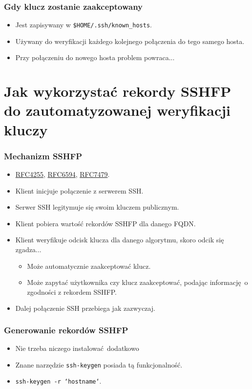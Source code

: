 \documentclass[dvipsnames,table]{beamer}
\begin{document}
\begin{frame}
\frametitle{Gdy klucz zostanie zaakceptowany}
\begin{itemize}
	\item Jest zapisywany w {\tt \$HOME/.ssh/known\_hosts}.
	\item Używany do weryfikacji każdego kolejnego połączenia do tego samego hosta.
	\item Przy połączeniu do nowego hosta problem powraca...
\end{itemize}
\end{frame}

\section{Jak wykorzystać rekordy SSHFP do zautomatyzowanej weryfikacji kluczy}

\begin{frame}
\frametitle{Mechanizm SSHFP}
\begin{itemize}
	\item \href{https://tools.ietf.org/html/rfc4255}{RFC4255},
		  \href{https://tools.ietf.org/html/rfc6594}{RFC6594},
		  \href{https://tools.ietf.org/html/rfc7479}{RFC7479}.
	\item Klient inicjuje połączenie z serwerem SSH.
	\item Serwer SSH legitymuje się swoim kluczem publicznym.
	\item Klient pobiera wartość rekordów SSHFP dla danego FQDN.
	\item Klient weryfikuje odcisk klucza dla danego algorytmu, skoro odcik się zgadza...
	\begin{itemize}
		\item Może automatycznie zaakceptować klucz.
		\item Może zapytać użytkownika czy klucz zaakceptować, podając informację o zgodności z rekordem SSHFP.
	\end{itemize}
	\item Dalej połączenie SSH przebiega jak zazwyczaj.
\end{itemize}
\end{frame}

\begin{frame}
\frametitle{Generowanie rekordów SSHFP}
\begin{itemize}
	\item Nie trzeba niczego instalować dodatkowo \Smiley
	\item Znane narzędzie {\tt ssh-keygen} posiada tą funkcjonalność.
	\item {\tt ssh-keygen -r `hostname`}.
\end{itemize}
\end{frame}
\end{document}
